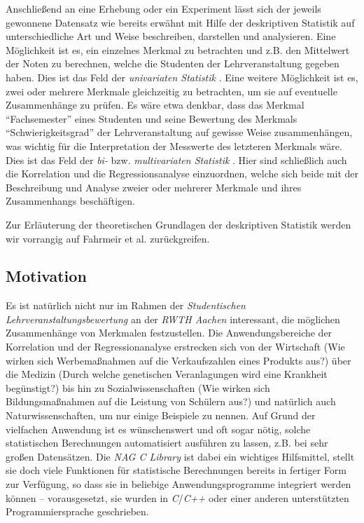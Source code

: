 Anschließend an eine Erhebung oder ein Experiment lässt sich  der jeweils gewonnene Datensatz wie bereits erwähnt mit Hilfe der deskriptiven Statistik auf unterschiedliche Art und Weise beschreiben, darstellen und analysieren. Eine Möglichkeit ist es, ein einzelnes Merkmal zu betrachten und z.B. den Mittelwert der Noten zu berechnen, welche die Studenten der Lehrveranstaltung gegeben haben. Dies ist das Feld der {\it univariaten Statistik} \cite[S. 31]{Fahrmeir2010}. Eine weitere Möglichkeit ist es, zwei oder mehrere Merkmale gleichzeitig zu betrachten, um sie auf eventuelle Zusammenhänge zu prüfen. Es wäre etwa denkbar, dass das Merkmal "`Fachsemester"' eines Studenten und seine Bewertung des Merkmals "`Schwierigkeitsgrad"' der Lehrveranstaltung auf gewisse Weise zusammenhängen, was wichtig für die Interpretation der Messwerte des letzteren Merkmals wäre. Dies ist das Feld der {\it bi-} bzw. {\it multivariaten Statistik} \cite[S. 109]{Fahrmeir2010}. Hier sind schließlich auch die Korrelation und die Regressionsanalyse einzuordnen, welche sich beide mit der Beschreibung und Analyse zweier oder mehrerer Merkmale und ihres Zusammenhangs beschäftigen.

Zur Erläuterung der theoretischen Grundlagen der deskriptiven Statistik werden wir vorrangig auf Fahrmeir et al. \cite{Fahrmeir2010} zurückgreifen.

\subsection{Motivation}
\label{sec:motivation}

Es ist natürlich nicht nur im Rahmen der {\it Studentischen Lehrveranstaltungsbewertung} an der {\it RWTH Aachen} interessant, die möglichen Zusammenhänge von Merkmalen festzustellen. Die Anwendungsbereiche der Korrelation und der Regressionanalyse erstrecken sich von der Wirtschaft (Wie wirken sich Werbemaßnahmen auf die Verkaufszahlen eines Produkts aus?) über die Medizin (Durch welche genetischen Veranlagungen wird eine Krankheit begünstigt?) bis hin zu Sozialwissenschaften (Wie wirken sich Bildungsmaßnahmen auf die Leistung von Schülern aus?) und natürlich auch Naturwissenschaften, um nur einige Beispiele zu nennen. Auf Grund der vielfachen Anwendung ist es wünschenswert und oft sogar nötig, solche statistischen Berechnungen automatisiert ausführen zu lassen, z.B. bei sehr großen Datensätzen. Die {\it NAG C Library} ist dabei ein wichtiges Hilfsmittel, stellt sie doch viele Funktionen für statistische Berechnungen bereits in fertiger Form zur Verfügung, so dass sie in beliebige Anwendungsprogramme integriert werden können -- vorausgesetzt, sie wurden in {\it C}/{\it C++} oder einer anderen unterstützten Programmiersprache geschrieben.

